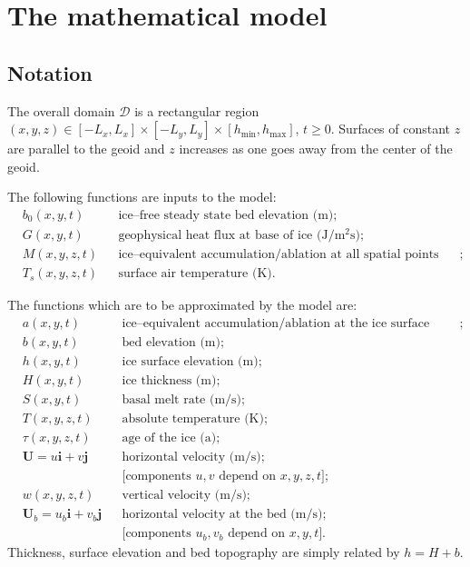 \documentclass{amsart}%
\theoremstyle{plain}
\theoremstyle{definition}
\theoremstyle{remark}
\newcommand{\ihat}{\mathbf{i}}
\newcommand{\jhat}{\mathbf{j}}
\newcommand{\hmin}{h_{\text{min}}}
\newcommand{\hmax}{h_{\text{max}}}
\newcommand{\bU}{{\mathbf{U}}}
\begin{document}
\maketitle


\section{The mathematical model}
\label{mathmodelsect}
\subsection{Notation}  The overall domain $\mathcal{D}$ is a rectangular region $(x,y,z)\in [-L_x,L_x]\times [-L_y,L_y]\times[\hmin,\hmax]$, $t\ge 0$.  Surfaces of constant $z$ are parallel to the geoid and $z$ increases as one goes away from the center of the geoid.

The following functions are inputs to the model:
\begin{align*}
&b_0(x,y,t) &&\text{ice--free steady state bed elevation (m)}; \\
&G(x,y,t) &&\text{geophysical heat flux at base of ice (J/$\text{m}^2$s)};\\
&M(x,y,z,t) &&\text{ice--equivalent accumulation/ablation at all spatial points (m/s)};\\
&T_s(x,y,z,t) &&\text{surface air temperature (K)}.
\end{align*}

The functions which are to be approximated by the model are:
\begin{align*}
&a(x,y,t) &&\text{ice--equivalent accumulation/ablation at the ice surface (m/s)};\\
&b(x,y,t) &&\text{bed elevation (m)}; \\
&h(x,y,t) &&\text{ice surface elevation (m)};\\
&H(x,y,t) &&\text{ice thickness (m)};\\
&S(x,y,t) &&\text{basal melt rate (m/s);}\\
&T(x,y,z,t) &&\text{absolute temperature (K)};\\
&\tau(x,y,z,t) &&\text{age of the ice (a)};\\
&\bU=u\ihat+v\jhat &&\text{horizontal velocity (m/s);}\\
&&& \text{[components } u,v \text{ depend on } x,y,z,t];\\
&w(x,y,z,t) &&\text{vertical velocity (m/s);}\\
&\bU_b=u_b\ihat+v_b\jhat &&\text{horizontal velocity at the bed (m/s);}\\
&&& \text{[components } u_b,v_b \text{ depend on } x,y,t].
\end{align*}
Thickness, surface elevation and bed topography are simply related by $h=H+b$.
\end{document}
